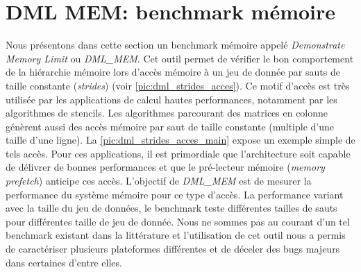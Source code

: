 \section{DML MEM: benchmark mémoire}\label{sec:dmlmem}

    Nous présentons dans cette section un benchmark mémoire appelé \textit{Demonstrate Memory Limit} ou \textit{DML\_MEM}. Cet outil permet de vérifier le bon comportement de la hiérarchie mémoire lors d'accès mémoire à un jeu de donnée par sauts de taille constante (\textit{strides}) (voir \autoref{pic:dml_strides_acces}). Ce motif d'accès est très utilisée par les applications de calcul hautes performances, notamment par les algorithmes de stencils. Les algorithmes parcourant des matrices en colonne génèrent aussi des accès mémoire par saut de taille constante (multiple d'une taille d'une ligne). La \autoref{pic:dml_strides_acces_main} expose un exemple simple de tels accès. Pour ces applications, il est primordiale que l'architecture soit capable de délivrer de bonnes performances et que le pré-lecteur mémoire (\textit{memory prefetch}) anticipe ces accès. L'objectif de \textit{DML\_MEM} est de mesurer la performance du système mémoire pour ce type d'accès. La performance variant avec la taille du jeu de données, le benchmark teste différentes tailles de sauts pour différentes taille de jeu de donnée. Nous ne sommes pas au courant d'un tel benchmark existant dans la littérature et l'utilisation de cet outil nous a permis de caractériser plusieurs plateformes différentes et de déceler des bugs majeurs dans certaines d'entre elles.

